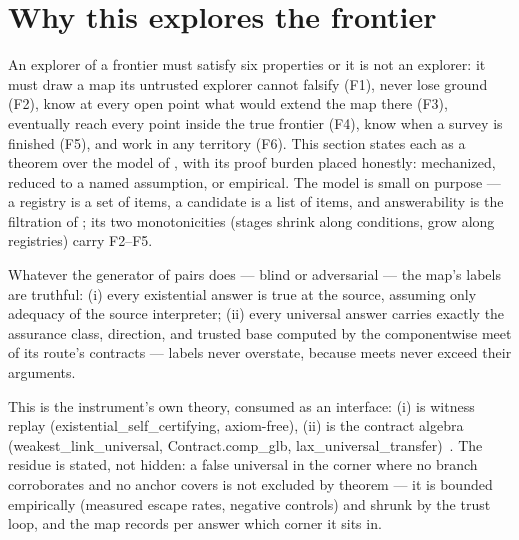 
\section{Why this explores the frontier}
\label{sec:theorems}

An explorer of a frontier must satisfy six properties or it is not an
explorer: it must draw a map its untrusted explorer cannot falsify
(F1), never lose ground (F2), know at every open point what would
extend the map there (F3), eventually reach every point inside the
true frontier (F4), know when a survey is finished (F5), and work in
any territory (F6). This section states each as a theorem over the
model of , with its proof burden placed honestly:
mechanized, reduced to a named assumption, or empirical. The model is
small on purpose --- a registry is a set of items, a candidate is a
list of items, and answerability is the filtration of
; its two monotonicities (stages shrink along
conditions, grow along registries) carry F2--F5.

\begin{theorem}
\label{thm:sound}
Whatever the generator of pairs does --- blind or adversarial ---
the map's labels are truthful: (i) every existential answer is true
at the source, assuming only adequacy of the source interpreter; (ii)
every universal answer carries exactly the assurance class,
direction, and trusted base computed by the componentwise meet of its
route's contracts --- labels never overstate, because meets never
exceed their arguments.
\end{theorem}

\noindent
This is the instrument's own theory, consumed as an interface: (i) is
witness replay (\textsf{existential\_self\_certifying}, axiom-free),
(ii) is the contract algebra
(\textsf{weakest\_link\_universal}, \textsf{Contract.comp\_glb},
\textsf{lax\_universal\_transfer})~\citep{hurdygurdy2026calculus}.
The residue is stated, not hidden: a false universal in the corner
where no branch corroborates and no anchor covers is not excluded by
theorem --- it is bounded empirically (measured escape rates,
negative controls) and shrunk by the trust loop, and the map records
per answer which corner it sits in.

